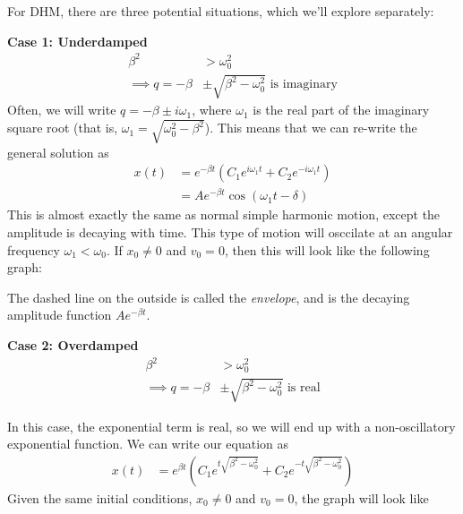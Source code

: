 \documentclass[a4paper]{article}
\begin{document}
For DHM, there are three potential situations, which we'll explore separately:

\noindent\textbf{Case 1: Underdamped}
\begin{align*}\beta^2&> \omega_0^2\\
	\implies q = -\beta&\pm\sqrt{\beta^2-\omega_0^2}
\text{ is imaginary}\end{align*}
Often, we will write $q = -\beta\pm i\omega_1$, where
$\omega_1$ is the real part of the imaginary square root (that is,
$\omega_1 = \sqrt{\omega_0^2-\beta^2}$). This means that we can re-write the
general solution as
\begin{align*}
	x(t) &= e^{-\beta t}\left(C_1e^{i\omega_1t}+C_2e^{-i\omega_1t}\right)\\
	     &= Ae^{-\beta t}\cos(\omega_1t-\delta)
\end{align*}
This is almost exactly the same as normal simple harmonic motion, except the
amplitude is decaying with time. This type of motion will osccilate at
an angular frequency $\omega_1<\omega_0$. If $x_0\neq0$ and $v_0=0$, then this
will look like the following graph:

\begin{center}
\end{center}
The dashed line on the outside is called the \emph{envelope}, and is the
decaying amplitude function $Ae^{-\beta t}$.

\noindent\textbf{Case 2: Overdamped}
\begin{align*}\beta^2&> \omega_0^2\\
	\implies q = -\beta&\pm\sqrt{\beta^2-\omega_0^2}
\text{ is real}\end{align*}

In this case, the exponential term is real, so we will end up with a
non-oscillatory exponential function. We can write our equation as
\begin{align*}
	x(t) &= e^{\beta t}\left(C_1e^{t\sqrt{\beta^2-\omega_0^2}} +
	C_2e^{-t\sqrt{\beta^2-\omega_0^2}}\right)
\end{align*}
Given the same initial conditions, $x_0\neq0$ and $v_0=0$, the graph will
look like
\begin{center}
\end{center}
\end{document}
